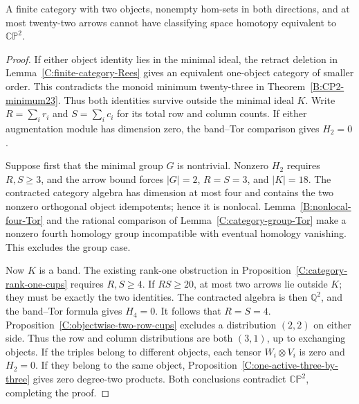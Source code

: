 \begin{theorem}
\label{C:twentytwo-strongly-connected}
A finite category with two objects, nonempty hom-sets in both
directions, and at most twenty-two arrows cannot have classifying
space homotopy equivalent to $\mathbb{CP}^2$.
\end{theorem}
\begin{proof}
If either object identity lies in the minimal ideal, the retract
deletion in Lemma~\ref{C:finite-category-Rees} gives an equivalent
one-object category of smaller order.  This contradicts the monoid
minimum twenty-three in Theorem~\ref{B:CP2-minimum23}.  Thus both
identities survive outside the minimal ideal $K$.
Write $R=\sum_i r_i$ and $S=\sum_i c_i$ for its total row and
column counts.  If either augmentation module has dimension zero,
the band--Tor comparison gives $H_2=0$.

Suppose first that the minimal group $G$ is nontrivial.  Nonzero
$H_2$ requires $R,S\geq3$, and the arrow bound forces
$|G|=2$, $R=S=3$, and $|K|=18$.
The contracted category algebra has dimension at most four and
contains the two nonzero orthogonal object idempotents; hence it
is nonlocal.  Lemma~\ref{B:nonlocal-four-Tor} and the rational
comparison of Lemma~\ref{C:category-group-Tor} make a nonzero
fourth homology group incompatible with eventual homology
vanishing.  This excludes the group case.

Now $K$ is a band.  The existing rank-one obstruction in
Proposition~\ref{C:category-rank-one-cups} requires $R,S\geq4$.
If $RS\geq20$, at most two arrows lie outside $K$; they must be
exactly the two identities.  The contracted algebra is then
$\mathbb Q^2$, and the band--Tor formula gives $H_4=0$.
It follows that $R=S=4$.
Proposition~\ref{C:objectwise-two-row-cups} excludes a distribution
$(2,2)$ on either side.  Thus the row and column distributions
are both $(3,1)$, up to exchanging objects.
If the triples belong to different objects, each tensor
$W_i\otimes V_i$ is zero and $H_2=0$.
If they belong to the same object,
Proposition~\ref{C:one-active-three-by-three} gives zero
degree-two products.  Both conclusions contradict
$\mathbb{CP}^2$, completing the proof.
\end{proof}
